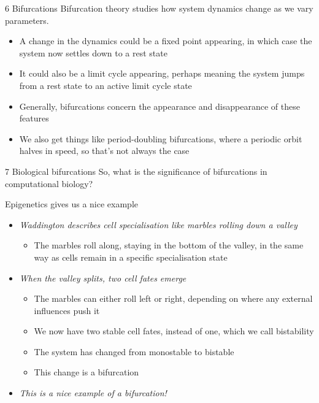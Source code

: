 \documentclass[presentation]{beamer}
\begin{document}
\begin{frame}[label={sec:org9081dfc}]{6 Bifurcations}
Bifurcation theory studies how system dynamics change as we vary parameters.

\begin{itemize}
\item A change in the dynamics could be a fixed point appearing, in which case the system now settles down to a rest state
\item It could also be a limit cycle appearing, perhaps meaning the system jumps from a rest state to an active limit cycle state
\item Generally, bifurcations concern the appearance and disappearance of these features
\item We also get things like period-doubling bifurcations, where a periodic orbit halves in speed, so that's not always the case
\end{itemize}
\end{frame}


\begin{frame}[label={sec:org94255c3}]{7 Biological bifurcations}
So, what is the significance of bifurcations in computational biology?

Epigenetics gives us a nice example

\begin{itemize}
\item \emph{Waddington describes cell specialisation like marbles rolling down a valley}
\begin{itemize}
\item The marbles roll along, staying in the bottom of the valley, in the same way as cells remain in a specific specialisation state
\end{itemize}

\item \emph{When the valley splits, two cell fates emerge}
\begin{itemize}
\item The marbles can either roll left or right, depending on where any external influences push it
\item We now have two stable cell fates, instead of one, which we call bistability
\item The system has changed from monostable to bistable
\item This change is a bifurcation
\end{itemize}

\item \emph{This is a nice example of a bifurcation!}
\end{itemize}
\end{frame}
\end{document}
